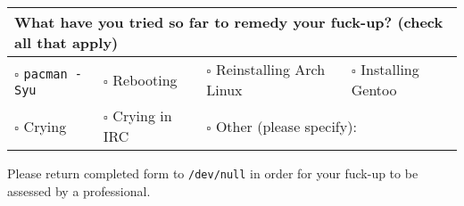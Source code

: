 \documentclass{article}
\begin{document}
\vspace{0.5em}

\begin{tabularx}{\textwidth}{|lllX|}
\hline
\multicolumn{4}{|l|}{\textbf{What have you tried so far to remedy your fuck-up?} (check all that apply)} \\ \hline
\(\square\) \texttt{pacman -Syu} &
\(\square\) Rebooting &
\(\square\) Reinstalling Arch Linux &
\(\square\) Installing Gentoo \\

\(\square\) Crying &
\(\square\) Crying in IRC &
\multicolumn{2}{l|}{\(\square\) Other (please specify): \dotfill} \\ \hline
\end{tabularx}

\vspace*{\fill}
\begin{center}
Please return completed form to \texttt{/dev/null} in order for your fuck-up to be assessed by a professional.
\end{center}
\end{document}
